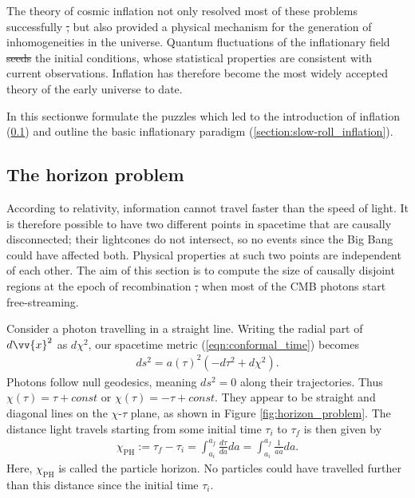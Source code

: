 \documentclass[a4paper,12pt,times,custombib,print,index]{Classes/PhDThesisPSnPDF} %
\providecommand{\DIFadd}[1]{{\protect\color{blue}\uwave{#1}}} %
\providecommand{\DIFdel}[1]{{\protect\color{red}\sout{#1}}}                      %
\providecommand{\DIFaddbegin}{} %
\providecommand{\DIFaddend}{} %
\providecommand{\DIFdelbegin}{} %
\providecommand{\DIFdelend}{} %
\newcommand{\DIFscaledelfig}{0.5}
\newlength{\DIFdelgraphicswidth} %
\newlength{\DIFdelgraphicsheight} %
\newcommand{\DIFaddincludegraphics}[2][]{{\color{blue}\fbox{\DIFOincludegraphics[#1]{#2}}}} %
\newcommand{\DIFdelincludegraphics}[2][]{%
\sbox{\DIFdelgraphicsbox}{\DIFOincludegraphics[#1]{#2}}%
\settoboxwidth{\DIFdelgraphicswidth}{\DIFdelgraphicsbox} %
\settoboxtotalheight{\DIFdelgraphicsheight}{\DIFdelgraphicsbox} %
\scalebox{\DIFscaledelfig}{%
\parbox[b]{\DIFdelgraphicswidth}{\usebox{\DIFdelgraphicsbox}\\[-\baselineskip] \rule{\DIFdelgraphicswidth}{0em}}\llap{\resizebox{\DIFdelgraphicswidth}{\DIFdelgraphicsheight}{%
\setlength{\unitlength}{\DIFdelgraphicswidth}%
\begin{picture}(1,1)%
\thicklines\linethickness{2pt} %
{\color[rgb]{1,0,0}\put(0,0){\framebox(1,1){}}}%
{\color[rgb]{1,0,0}\put(0,0){\line( 1,1){1}}}%
{\color[rgb]{1,0,0}\put(0,1){\line(1,-1){1}}}%
\end{picture}%
}\hspace*{3pt}}} %
} %
\DeclareRobustCommand{\DIFaddbegin}{\DIFOaddbegin \let\includegraphics\DIFaddincludegraphics} %
\DeclareRobustCommand{\DIFaddend}{\DIFOaddend \let\includegraphics\DIFOincludegraphics} %
\DeclareRobustCommand{\DIFdelbegin}{\DIFOdelbegin \let\includegraphics\DIFdelincludegraphics} %
\DeclareRobustCommand{\DIFdelend}{\DIFOaddend \let\includegraphics\DIFOincludegraphics} %
\begin{document}
The theory of cosmic inflation not only resolved most of these problems successfully \DIFdelbegin \DIFdel{, }\DIFdelend but also provided a physical mechanism for the generation of inhomogeneities in the universe. Quantum fluctuations of the inflationary field \DIFdelbegin \DIFdel{seeds }\DIFdelend \DIFaddbegin \DIFadd{seed }\DIFaddend the initial conditions, whose statistical properties are consistent with current observations. Inflation has therefore become the most widely accepted theory of the early universe to date.

In this section\DIFaddbegin \DIFadd{, }\DIFaddend we formulate the puzzles which led to the introduction of inflation (\ref{section:the_horizon_problem}) and outline the basic inflationary paradigm (\ref{section:slow-roll_inflation}).

\subsection{The horizon problem}
\label{section:the_horizon_problem}

According to relativity, information cannot travel faster than the speed of light. It is therefore possible to have two different points in spacetime that are causally disconnected; their lightcones do not intersect, so no events since the Big Bang could have affected both. Physical properties at such two points are independent of each other. The aim of this section is to compute the size of causally disjoint regions at the epoch of recombination \DIFdelbegin \DIFdel{, }\DIFdelend when most of the CMB photons start free-streaming.

Consider a photon travelling in a straight line. Writing the radial part of $d\vv{x}^2$ as $d\chi^2$, our spacetime metric (\ref{eqn:conformal_time}) becomes
\begin{align}
	ds^2 = a(\tau)^2 (-d\tau^2 +d\chi^2).
\end{align}
Photons follow null geodesics, meaning $ds^2=0$ along their trajectories. Thus $\chi(\tau) = \tau + const$ or $\chi(\tau) = -\tau + const$. They appear to be straight and diagonal lines on the $\chi$-$\tau$ plane, as shown in Figure \ref{fig:horizon_problem}. The distance light travels starting from some initial time $\tau_i$ to $\tau_f$ is then given by
\begin{align}
	\chi_\text{PH} := \tau_f - \tau_i = \int_{a_i}^{a_f} \frac{d\tau}{da} da = \int_{a_i}^{a_f} \frac{1}{a\dot{a}} da. \label{def:physical_horizon}
\end{align}
Here, $\chi_\text{PH}$ is called the particle horizon. No particles could have travelled further than this distance since the initial time $\tau_i$.
\end{document}
